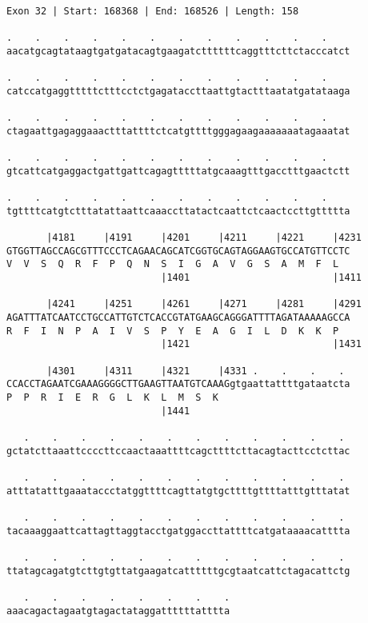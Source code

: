 \documentclass{article}
\begin{document}
\begin{Verbatim}
Exon 32 | Start: 168368 | End: 168526 | Length: 158
 
.    .    .    .    .    .    .    .    .    .    .    .    
aacatgcagtataagtgatgatacagtgaagatcttttttcaggtttcttctacccatct
  
.    .    .    .    .    .    .    .    .    .    .    .    
catccatgaggtttttctttcctctgagataccttaattgtactttaatatgatataaga
  
.    .    .    .    .    .    .    .    .    .    .    .    
ctagaattgagaggaaactttattttctcatgttttgggagaagaaaaaaatagaaatat
  
.    .    .    .    .    .    .    .    .    .    .    .    
gtcattcatgaggactgattgattcagagtttttatgcaaagtttgacctttgaactctt
  
.    .    .    .    .    .    .    .    .    .    .    .    
tgttttcatgtctttatattaattcaaaccttatactcaattctcaactccttgttttta
  
       |4181     |4191     |4201     |4211     |4221     |4231
GTGGTTAGCCAGCGTTTCCCTCAGAACAGCATCGGTGCAGTAGGAAGTGCCATGTTCCTC
V  V  S  Q  R  F  P  Q  N  S  I  G  A  V  G  S  A  M  F  L  
                           |1401                         |1411
  
       |4241     |4251     |4261     |4271     |4281     |4291
AGATTTATCAATCCTGCCATTGTCTCACCGTATGAAGCAGGGATTTTAGATAAAAAGCCA
R  F  I  N  P  A  I  V  S  P  Y  E  A  G  I  L  D  K  K  P  
                           |1421                         |1431
  
       |4301     |4311     |4321     |4331 .    .    .    . 
CCACCTAGAATCGAAAGGGGCTTGAAGTTAATGTCAAAGgtgaattattttgataatcta
P  P  R  I  E  R  G  L  K  L  M  S  K                       
                           |1441                            
  
   .    .    .    .    .    .    .    .    .    .    .    . 
gctatcttaaattccccttccaactaaattttcagcttttcttacagtacttcctcttac
  
   .    .    .    .    .    .    .    .    .    .    .    . 
atttatatttgaaataccctatggttttcagttatgtgcttttgttttatttgtttatat
  
   .    .    .    .    .    .    .    .    .    .    .    . 
tacaaaggaattcattagttaggtacctgatggaccttattttcatgataaaacatttta
  
   .    .    .    .    .    .    .    .    .    .    .    . 
ttatagcagatgtcttgtgttatgaagatcattttttgcgtaatcattctagacattctg
  
   .    .    .    .    .    .    .    .
aaacagactagaatgtagactataggattttttatttta
\end{Verbatim}
\end{document}
